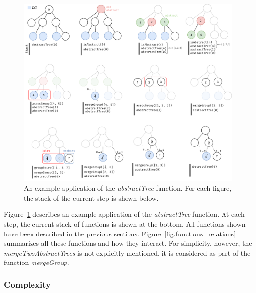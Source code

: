 \documentclass[sigconf,authordraft]{acmart}
\theoremstyle{definition}
\newtheorem{defn}{Definition}[section]
\begin{document}
\begin{figure}[]
  \centering
  \includegraphics[width=0.8\linewidth]{explanations/steps_abstractTree}
  \caption{An example application of the \emph{abstractTree} function. For each figure, the stack of the current step is shown below.}
  \label{fig:steps_abstractTree}
\end{figure}

Figure~\ref{fig:steps_abstractTree} describes an example application of the \emph{abstractTree} function.
At each step, the current stack of functions is shown at the bottom.
All functions shown have been described in the previous sections.
Figure~\ref{fig:functions_relations} summarizes all these functions and how they interact.
For simplicity, however, the \emph{mergeTwoAbstractTrees} is not explicitly mentioned, it is considered as part of the function \emph{mergeGroup}.

\subsubsection{Complexity}


\end{document}
